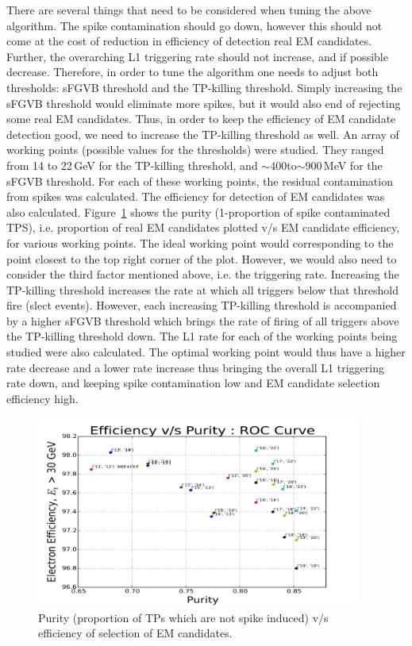 There are several things that need to be considered when tuning the above algorithm. The spike contamination should go down, however this should not come at the cost of reduction in efficiency of detection real EM candidates. Further, the overarching L1 triggering rate should not increase, and if possible decrease. Therefore, in order to tune the algorithm one needs to adjust both thresholds: sFGVB threshold and the TP-killing threshold. Simply increasing the sFGVB threshold would eliminate more spikes, but it would also end of rejecting some real EM candidates. Thus, in order to keep the efficiency of EM candidate detection good, we need to increase the TP-killing threshold as well. An array of working points (possible values for the thresholds) were studied. They ranged from 14 to 22\,GeV for the TP-killing threshold, and $\sim400$to$\sim900\,$MeV for the sFGVB threshold. For each of these working points, the residual contamination from spikes was calculated. The efficiency for detection of EM candidates was also calculated. Figure~\ref{fig:spikeroc} shows the purity (1-proportion of spike contaminated TPS), i.e. proportion of real EM candidates  plotted v/s EM candidate efficiency, for various working points. The ideal working point would corresponding to the point closest to the top right corner of the plot. However, we would also need to consider the third factor mentioned above, i.e. the triggering rate. Increasing the TP-killing threshold increases the rate at which all triggers below that threshold fire (slect events). However, each increasing TP-killing threshold is accompanied by a higher sFGVB threshold which brings the rate of firing of all triggers above the TP-killing threshold down. The L1 rate for each of the working points being studied were also calculated. The optimal working point would thus have a higher rate decrease and a lower rate increase thus bringing the overall L1 triggering rate down, and keeping spike contamination low and EM candidate selection efficiency high.

\begin{figure}
\begin{center}
  \includegraphics[width=0.95\textwidth,keepaspectratio]{plots_and_figures/chapter3/spikeroc.png}
\caption{Purity (proportion of TPs which are not spike induced) v/s efficiency of selection of EM candidates. }
\label{fig:spikeroc}
\end{center}
\end{figure}


